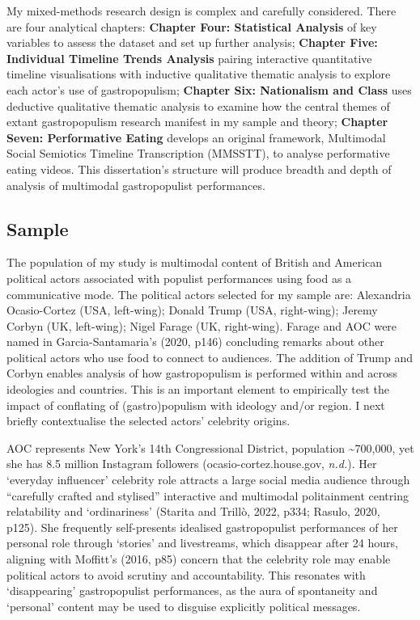 \documentclass[a4paper, nobind]{templates/ociamthesis}
\begin{document}
My mixed-methods research design is complex and carefully considered. There are four analytical chapters: \textbf{Chapter Four: Statistical Analysis} of key variables to assess the dataset and set up further analysis; \textbf{Chapter Five: Individual Timeline Trends Analysis} pairing interactive quantitative timeline visualisations with inductive qualitative thematic analysis to explore each actor's use of gastropopulism; \textbf{Chapter Six: Nationalism and Class} uses deductive qualitative thematic analysis to examine how the central themes of extant gastropopulism research manifest in my sample and theory; \textbf{Chapter Seven: Performative Eating} develops an original framework, Multimodal Social Semiotics Timeline Transcription (MMSSTT), to analyse performative eating videos. This dissertation's structure will produce breadth and depth of analysis of multimodal gastropopulist performances.

\hypertarget{sample}{%
\subsection*{Sample}\label{sample}}

The population of my study is multimodal content of British and American political actors associated with populist performances using food as a communicative mode. The political actors selected for my sample are: Alexandria Ocasio-Cortez (USA, left-wing); Donald Trump (USA, right-wing); Jeremy Corbyn (UK, left-wing); Nigel Farage (UK, right-wing). Farage and AOC were named in Garcia-Santamaria's (2020, p146) concluding remarks about other political actors who use food to connect to audiences. The addition of Trump and Corbyn enables analysis of how gastropopulism is performed within and across ideologies and countries. This is an important element to empirically test the impact of conflating of (gastro)populism with ideology and/or region. I next briefly contextualise the selected actors' celebrity origins.

AOC represents New York's 14th Congressional District, population \textasciitilde700,000, yet she has 8.5 million Instagram followers (ocasio-cortez.house.gov, \emph{n.d.}). Her `everyday influencer' celebrity role attracts a large social media audience through ``carefully crafted and stylised'' interactive and multimodal politainment centring relatability and `ordinariness' (Starita and Trillò, 2022, p334; Rasulo, 2020, p125). She frequently self-presents idealised gastropopulist performances of her personal role through `stories' and livestreams, which disappear after 24 hours, aligning with Moffitt's (2016, p85) concern that the celebrity role may enable political actors to avoid scrutiny and accountability. This resonates with `disappearing' gastropopulist performances, as the aura of spontaneity and `personal' content may be used to disguise explicitly political messages.
\end{document}
